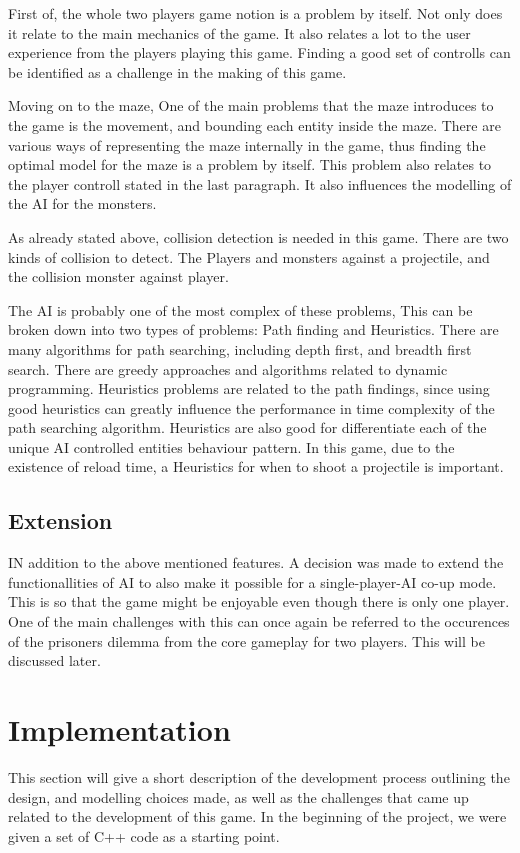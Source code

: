 \documentclass{article}
\begin{document}
  First of, the whole two players game notion is a problem by itself. Not only does it relate to the main mechanics of the game. It also relates a lot to the user experience from the players playing this game. Finding a good set of controlls can be identified as a challenge in the making of this game.

  Moving on to the maze, One of the main problems that the maze introduces to the game is the movement, and bounding each entity inside the maze. There are various ways of representing the maze internally in the game, thus finding the optimal model for the maze is a problem by itself. This problem also relates to the player controll stated in the last paragraph. It also influences the modelling of the AI for the monsters.

  As already stated above, collision detection is needed in this game. There are two kinds of collision to detect. The Players and monsters against a projectile, and the collision monster against player.

  The AI is probably one of the most complex of these problems, This can be broken down into two types of problems: Path finding and Heuristics. There are many algorithms for path searching, including depth first, and breadth first search. There are greedy approaches and algorithms related to dynamic programming. Heuristics problems are related to the path findings, since using good heuristics can greatly influence the performance in time complexity of the path searching algorithm. Heuristics are also good for differentiate each of the unique AI controlled entities behaviour pattern. In this game, due to the existence of reload time, a Heuristics for when to shoot a projectile is important.

  \subsection{Extension}
  IN addition to the above mentioned features. A decision was made to extend the functionallities of AI to also make it possible for a single-player-AI co-up mode. This is so that the game might be enjoyable even though there is only one player. One of the main challenges with this can once again be referred to the occurences of the prisoners dilemma from the core gameplay for two players. This will be discussed later.

  \section{Implementation}
  This section will give a short description of the development process outlining the design, and modelling choices made, as well as the challenges that came up related to the development of this game. In the beginning of the project, we were given a set of C++ code as a starting point.
\end{document}
